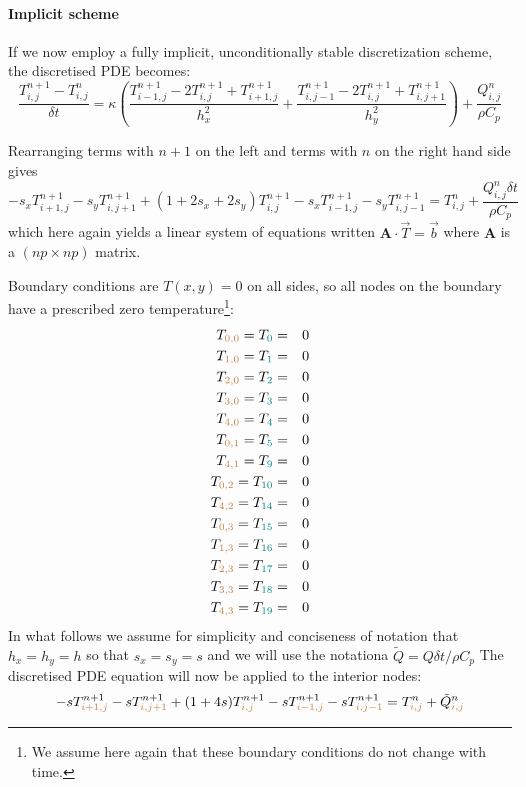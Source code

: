 \paragraph{Implicit scheme} 
If we now employ a fully implicit, unconditionally stable discretization scheme, the discretised 
PDE becomes:
\[
\frac{T_{i,j}^{n+1}-T_{i,j}^n}{\delta t}
= \kappa
\left(
\frac{ T_{i-1,j}^{n+1}-2T_{i,j}^{n+1}+T_{i+1,j}^{n+1}  }{h_x^2} + 
\frac{ T_{i,j-1}^{n+1}-2T_{i,j}^{n+1}+T_{i,j+1}^{n+1}  }{h_y^2}
\right)
+\frac{Q_{i,j}^n}{\rho C_p}
\]

Rearranging terms with $n+1$ on the left and terms with $n$ on the right hand side gives
\[
-s_x T_{i+1,j}^{n+1}-s_y T_{i,j+1}^{n+1} +(1+2s_x+2s_y)T_{i,j}^{n+1} -s_x T_{i-1,j}^{n+1} -s_y T_{i,j-1}^{n+1} 
=
T_{i,j}^n
+\frac{Q_{i,j}^n \delta t}{\rho C_p}
\]
which here again yields a linear system of equations written ${\bm A}\cdot {\vec T} = {\vec b}$
where ${\bm A}$ is a $(np \times np)$ matrix.



Boundary conditions are $T(x,y)=0$ on all sides, so all nodes 
on the boundary have a prescribed zero temperature\footnote{We assume
here again that these boundary conditions do not change with time.}:
\begin{eqnarray}
T_{\color{brown}0,0} = T_{\color{teal} 0} &=& 0 \nonumber\\
T_{\color{brown}1,0} = T_{\color{teal} 1} &=& 0 \nonumber\\
T_{\color{brown}2,0} = T_{\color{teal} 2} &=& 0 \nonumber\\
T_{\color{brown}3,0} = T_{\color{teal} 3} &=& 0 \nonumber\\
T_{\color{brown}4,0} = T_{\color{teal} 4} &=& 0 \nonumber\\
T_{\color{brown}0,1} = T_{\color{teal} 5} &=& 0 \nonumber\\
T_{\color{brown}4,1} = T_{\color{teal} 9} &=& 0 \nonumber\\
T_{\color{brown}0,2} = T_{\color{teal} 10} &=& 0 \nonumber\\
T_{\color{brown}4,2} = T_{\color{teal} 14} &=& 0 \nonumber\\
T_{\color{brown}0,3} = T_{\color{teal} 15} &=& 0 \nonumber\\
T_{\color{brown}1,3} = T_{\color{teal} 16} &=& 0 \nonumber\\
T_{\color{brown}2,3} = T_{\color{teal} 17} &=& 0 \nonumber\\
T_{\color{brown}3,3} = T_{\color{teal} 18} &=& 0 \nonumber\\
T_{\color{brown}4,3} = T_{\color{teal} 19} &=& 0 \nonumber
\end{eqnarray}
In what follows we assume for simplicity and conciseness of notation that 
$h_x=h_y=h$ so that $s_x=s_y=s$ and we will use the notationa $\tilde{Q}=Q \delta t/\rho C_p$
The discretised PDE equation will now be applied to the interior nodes:
\[
-s T_{{\color{brown} i+1,j}}^{n+1}
-s T_{{\color{brown}i,j+1}}^{n+1} 
+(1+4s)T_{{\color{brown}i,j}}^{n+1} 
-s T_{{\color{brown}i-1,j}}^{n+1} 
-s T_{{\color{brown}i,j-1}}^{n+1} 
= T_{{\color{brown}i,j}}^n 
+\tilde{Q}_{{\color{brown}i,j}}^n
\]

